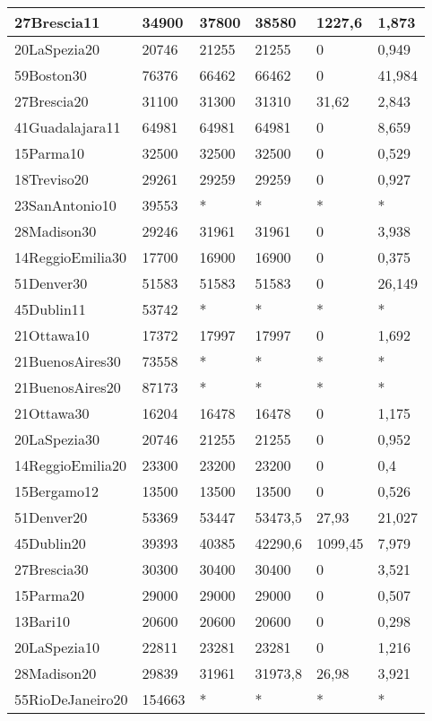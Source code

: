 \begin{longtable}[c]{|l|l|l|l|l|l|}
27Brescia11 & 34900 & 37800 & 38580 & 1227,6 & 1,873 \\ \hline
20LaSpezia20 & 20746 & 21255 & 21255 & 0 & 0,949 \\ \hline
59Boston30 & 76376 & 66462 & 66462 & 0 & 41,984 \\ \hline
27Brescia20 & 31100 & 31300 & 31310 & 31,62 & 2,843 \\ \hline
41Guadalajara11 & 64981 & 64981 & 64981 & 0 & 8,659 \\ \hline
15Parma10 & 32500 & 32500 & 32500 & 0 & 0,529 \\ \hline
18Treviso20 & 29261 & 29259 & 29259 & 0 & 0,927 \\ \hline
23SanAntonio10 & 39553 & * & * & * & * \\ \hline
28Madison30 & 29246 & 31961 & 31961 & 0 & 3,938 \\ \hline
14ReggioEmilia30 & 17700 & 16900 & 16900 & 0 & 0,375 \\ \hline
51Denver30 & 51583 & 51583 & 51583 & 0 & 26,149 \\ \hline
45Dublin11 & 53742 & * & * & * & * \\ \hline
21Ottawa10 & 17372 & 17997 & 17997 & 0 & 1,692 \\ \hline
21BuenosAires30 & 73558 & * & * & * & * \\ \hline
21BuenosAires20 & 87173 & * & * & * & * \\ \hline
21Ottawa30 & 16204 & 16478 & 16478 & 0 & 1,175 \\ \hline
20LaSpezia30 & 20746 & 21255 & 21255 & 0 & 0,952 \\ \hline
14ReggioEmilia20 & 23300 & 23200 & 23200 & 0 & 0,4 \\ \hline
15Bergamo12 & 13500 & 13500 & 13500 & 0 & 0,526 \\ \hline
51Denver20 & 53369 & 53447 & 53473,5 & 27,93 & 21,027 \\ \hline
45Dublin20 & 39393 & 40385 & 42290,6 & 1099,45 & 7,979 \\ \hline
27Brescia30 & 30300 & 30400 & 30400 & 0 & 3,521 \\ \hline
15Parma20 & 29000 & 29000 & 29000 & 0 & 0,507 \\ \hline
13Bari10 & 20600 & 20600 & 20600 & 0 & 0,298 \\ \hline
20LaSpezia10 & 22811 & 23281 & 23281 & 0 & 1,216 \\ \hline
28Madison20 & 29839 & 31961 & 31973,8 & 26,98 & 3,921 \\ \hline
55RioDeJaneiro20 & 154663 & * & * & * & * \\ \hline
\end{longtable}

